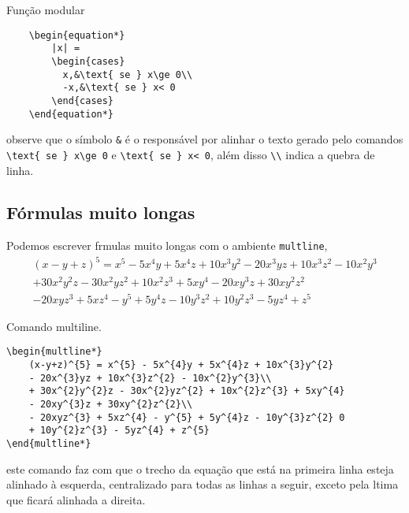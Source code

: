 \begin{programcode}{Função modular}
\begin{verbatim}
    \begin{equation*}
        |x| = 
        \begin{cases}
          x,&\text{ se } x\ge 0\\
          -x,&\text{ se } x< 0
        \end{cases}
    \end{equation*}
\end{verbatim}
\end{programcode}



\noindent observe que o s\'{i}mbolo \verb|&| \'{e} o respons\'{a}vel por alinhar o texto gerado pelo comandos \verb|\text{ se } x\ge 0| e \verb|\text{ se } x< 0|, al\'{e}m disso \verb|\\| indica a quebra de linha. 

\subsection{F\'{o}rmulas muito longas}
Podemos escrever frmulas muito longas com o ambiente \verb|multline|,
\begin{multline*}
    (x-y+z)^{5} = x^{5} - 5x^{4}y + 5x^{4}z + 10x^{3}y^{2} - 20x^{3}yz + 10x^{3}z^{2} - 10x^{2}y^{3}\\
    + 30x^{2}y^{2}z - 30x^{2}yz^{2} + 10x^{2}z^{3} + 5xy^{4} - 20xy^{3}z + 30xy^{2}z^{2}\\
    - 20xyz^{3} + 5xz^{4} - y^{5} + 5y^{4}z - 10y^{3}z^{2} + 10y^{2}z^{3} - 5yz^{4} + z^{5}
\end{multline*}

\begin{programcode}{Comando multiline.}
\begin{verbatim}
\begin{multline*}
    (x-y+z)^{5} = x^{5} - 5x^{4}y + 5x^{4}z + 10x^{3}y^{2} 
    - 20x^{3}yz + 10x^{3}z^{2} - 10x^{2}y^{3}\\
    + 30x^{2}y^{2}z - 30x^{2}yz^{2} + 10x^{2}z^{3} + 5xy^{4} 
    - 20xy^{3}z + 30xy^{2}z^{2}\\
    - 20xyz^{3} + 5xz^{4} - y^{5} + 5y^{4}z - 10y^{3}z^{2} 0
    + 10y^{2}z^{3} - 5yz^{4} + z^{5}
\end{multline*}
\end{verbatim}
\end{programcode}

\noindent este comando faz com que o trecho da equa\c c\~{a}o que est\'{a} na primeira linha esteja alinhado \`{a} esquerda, centralizado para todas as linhas a seguir, exceto pela ltima que ficar\'{a} alinhada a direita.

